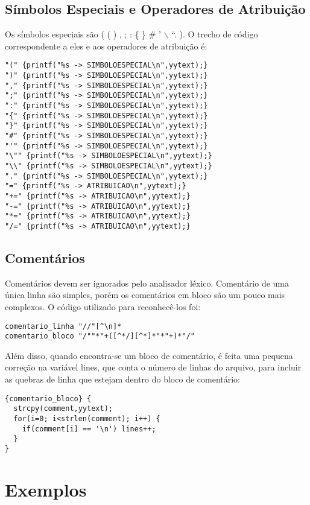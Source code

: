 \documentclass[a4paper,10pt]{article}
\begin{document}
  \subsection{Símbolos Especiais e Operadores de Atribuição}
  Os símbolos especiais são ( ( ) , ; : \{ \} \# ' $\backslash$ \textquotedblleft . ). O trecho de código correspondente a eles e aos operadores de atribuição é:
  \begin{verbatim}
"(" {printf("%s -> SIMBOLOESPECIAL\n",yytext);}
")" {printf("%s -> SIMBOLOESPECIAL\n",yytext);}
"," {printf("%s -> SIMBOLOESPECIAL\n",yytext);}
";" {printf("%s -> SIMBOLOESPECIAL\n",yytext);}
":" {printf("%s -> SIMBOLOESPECIAL\n",yytext);}
"{" {printf("%s -> SIMBOLOESPECIAL\n",yytext);}
"}" {printf("%s -> SIMBOLOESPECIAL\n",yytext);}
"#" {printf("%s -> SIMBOLOESPECIAL\n",yytext);}
"'" {printf("%s -> SIMBOLOESPECIAL\n",yytext);}
"\"" {printf("%s -> SIMBOLOESPECIAL\n",yytext);}
"\\" {printf("%s -> SIMBOLOESPECIAL\n",yytext);}
"." {printf("%s -> SIMBOLOESPECIAL\n",yytext);}
"=" {printf("%s -> ATRIBUICAO\n",yytext);}
"+=" {printf("%s -> ATRIBUICAO\n",yytext);}
"-=" {printf("%s -> ATRIBUICAO\n",yytext);}
"*=" {printf("%s -> ATRIBUICAO\n",yytext);}
"/=" {printf("%s -> ATRIBUICAO\n",yytext);}
  \end{verbatim}

\subsection{Comentários}
  Comentários devem ser ignorados pelo analisador léxico. Comentário de uma única linha são simples, porém os comentários em bloco
  são um pouco mais complexos. O código utilizado para reconhecê-los foi:
  \begin{verbatim}
comentario_linha "//"[^\n]*
comentario_bloco "/""*"+([^*/][^*]*"*"+)*"/"
\end{verbatim}
Além disso, quando encontra-se um bloco de comentário, é feita uma pequena correção na variável lines, que conta o número de linhas
do arquivo, para incluir as quebras de linha que estejam dentro do bloco de comentário:
\begin{verbatim}
{comentario_bloco} {
  strcpy(comment,yytext);	
  for(i=0; i<strlen(comment); i++) {
    if(comment[i] == '\n') lines++;
  }
}
\end{verbatim}

\section{Exemplos}
\end{document}

